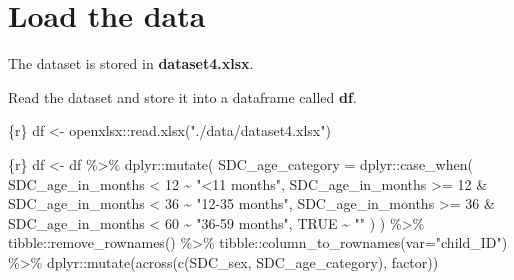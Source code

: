 \documentclass[
  letterpaper,
  DIV=11,
  numbers=noendperiod,
  oneside]{scrreprt}
\newenvironment{Shaded}{\begin{snugshade}}{\end{snugshade}}
\newcommand{\AttributeTok}[1]{\textcolor[rgb]{0.40,0.45,0.13}{#1}}
\newcommand{\ConstantTok}[1]{\textcolor[rgb]{0.56,0.35,0.01}{#1}}
\newcommand{\DecValTok}[1]{\textcolor[rgb]{0.68,0.00,0.00}{#1}}
\newcommand{\FunctionTok}[1]{\textcolor[rgb]{0.28,0.35,0.67}{#1}}
\newcommand{\InformationTok}[1]{\textcolor[rgb]{0.37,0.37,0.37}{#1}}
\newcommand{\NormalTok}[1]{\textcolor[rgb]{0.00,0.23,0.31}{#1}}
\newcommand{\OtherTok}[1]{\textcolor[rgb]{0.00,0.23,0.31}{#1}}
\newcommand{\SpecialCharTok}[1]{\textcolor[rgb]{0.37,0.37,0.37}{#1}}
\newcommand{\StringTok}[1]{\textcolor[rgb]{0.13,0.47,0.30}{#1}}
\begin{document}
\hypertarget{load-the-data}{%
\section{Load the data}\label{load-the-data}}

The dataset is stored in \textbf{dataset4.xlsx}.

Read the dataset and store it into a dataframe called \textbf{df}.

\begin{Shaded}
\begin{Highlighting}[]
\InformationTok{\textasciigrave{}\textasciigrave{}\textasciigrave{}\{r\}}
\NormalTok{df }\OtherTok{\textless{}{-}}\NormalTok{ openxlsx}\SpecialCharTok{::}\FunctionTok{read.xlsx}\NormalTok{(}\StringTok{"./data/dataset4.xlsx"}\NormalTok{)}
\InformationTok{\textasciigrave{}\textasciigrave{}\textasciigrave{}}
\end{Highlighting}
\end{Shaded}

\begin{Shaded}
\begin{Highlighting}[]
\InformationTok{\textasciigrave{}\textasciigrave{}\textasciigrave{}\{r\}}
\NormalTok{df }\OtherTok{\textless{}{-}}\NormalTok{ df }\SpecialCharTok{\%\textgreater{}\%}
\NormalTok{  dplyr}\SpecialCharTok{::}\FunctionTok{mutate}\NormalTok{(}
    \AttributeTok{SDC\_age\_category =}\NormalTok{ dplyr}\SpecialCharTok{::}\FunctionTok{case\_when}\NormalTok{(}
\NormalTok{      SDC\_age\_in\_months }\SpecialCharTok{\textless{}} \DecValTok{12} \SpecialCharTok{\textasciitilde{}} \StringTok{"\textless{}11 months"}\NormalTok{,}
\NormalTok{      SDC\_age\_in\_months }\SpecialCharTok{\textgreater{}=} \DecValTok{12} \SpecialCharTok{\&}\NormalTok{ SDC\_age\_in\_months }\SpecialCharTok{\textless{}} \DecValTok{36} \SpecialCharTok{\textasciitilde{}} \StringTok{"12{-}35 months"}\NormalTok{,}
\NormalTok{      SDC\_age\_in\_months }\SpecialCharTok{\textgreater{}=} \DecValTok{36} \SpecialCharTok{\&}\NormalTok{ SDC\_age\_in\_months }\SpecialCharTok{\textless{}} \DecValTok{60} \SpecialCharTok{\textasciitilde{}} \StringTok{"36{-}59 months"}\NormalTok{,}
      \ConstantTok{TRUE} \SpecialCharTok{\textasciitilde{}} \StringTok{""}
\NormalTok{    )}
\NormalTok{  ) }\SpecialCharTok{\%\textgreater{}\%}
\NormalTok{  tibble}\SpecialCharTok{::}\FunctionTok{remove\_rownames}\NormalTok{() }\SpecialCharTok{\%\textgreater{}\%}
\NormalTok{  tibble}\SpecialCharTok{::}\FunctionTok{column\_to\_rownames}\NormalTok{(}\AttributeTok{var=}\StringTok{"child\_ID"}\NormalTok{) }\SpecialCharTok{\%\textgreater{}\%}
\NormalTok{  dplyr}\SpecialCharTok{::}\FunctionTok{mutate}\NormalTok{(}\FunctionTok{across}\NormalTok{(}\FunctionTok{c}\NormalTok{(SDC\_sex,}
\NormalTok{                         SDC\_age\_category), factor))}
\InformationTok{\textasciigrave{}\textasciigrave{}\textasciigrave{}}
\end{Highlighting}
\end{Shaded}
\end{document}
